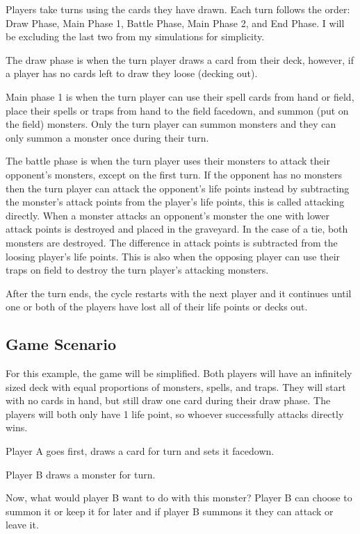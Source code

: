 Players take turns using the cards they have drawn. Each turn follows the order: Draw Phase, Main Phase 1, Battle Phase, Main Phase 2, and End Phase. I will be excluding the last two from my simulations for simplicity.

The draw phase is when the turn player draws a card from their deck, however, if a player has no cards left to draw they loose (decking out). 

Main phase 1 is when the turn player can use their spell cards from hand or field, place their spells or traps from hand to the field facedown, and summon (put on the field) monsters. Only the turn player can summon monsters and they can only summon a monster once during their turn. 

The battle phase is when the turn player uses their monsters to attack their opponent's monsters, except on the first turn. If the opponent has no monsters then the turn player can attack the opponent's life points instead by subtracting the monster's attack points from the player's life points, this is called attacking directly. When a monster attacks an opponent's monster the one with lower attack points is destroyed and placed in the graveyard. In the case of a tie, both monsters are destroyed. The difference in attack points is subtracted from the loosing player's life points. This is also when the opposing player can use their traps on field to destroy the turn player's attacking monsters.

After the turn ends, the cycle restarts with the next player and it continues until one or both of the players have lost all of their life points or decks out.

\subsection{Game Scenario}
For this example, the game will be simplified. Both players will have an infinitely sized deck with equal proportions of monsters, spells, and traps. They will start with no cards in hand, but still draw one card during their draw phase. The players will both only have 1 life point, so whoever successfully attacks directly wins.

Player A goes first, draws a card for turn and sets it facedown. 

Player B draws a monster for turn.

Now, what would player B want to do with this monster? Player B can choose to summon it or keep it for later and if player B summons it they can attack or leave it.

